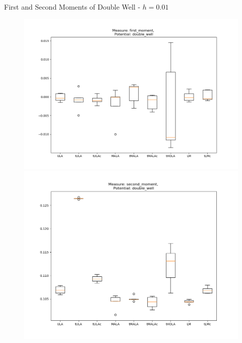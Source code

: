 \documentclass[aspectratio=169]{beamer}
\begin{document}
\begin{frame}{First and Second Moments of Double Well - \(h=0.01\)}%
        \begin{figure}[h]
        \centering
        \begin{minipage}{0.5\linewidth}
          \centering
          \includegraphics[width=0.99\linewidth]{10sBoxPlot1moment100dim001step.png}
        \end{minipage}%
        \begin{minipage}{0.5\linewidth}
          \centering
          \includegraphics[width=0.99\linewidth]{10sBoxPlot2moment100dim001step.png}
        \end{minipage}%
        \end{figure}
\end{frame}
\end{document}
